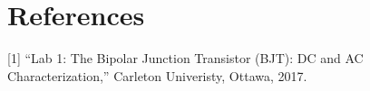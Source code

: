 \documentclass{article}
\begin{document}
	\pagebreak
	
	\section{References}
	[1] “Lab 1: The Bipolar Junction Transistor (BJT): DC and AC Characterization,” Carleton Univeristy, Ottawa, 2017.
\end{document}
